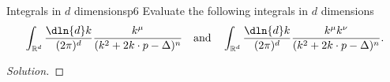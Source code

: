 \begin{problem}{Integrals in \(d\) dimensions}{p6}
   Evaluate the following integrals in \(d\) dimensions
   \begin{equation*}
      \int_{\mathbb{R}^d} \frac{\dln{d}k}{(2\pi)^d} \frac{k^\mu}{(k^2 + 2k \cdot p - \Delta)^n}
      \quad\text{and}\quad
      \int_{\mathbb{R}^d} \frac{\dln{d}k}{(2\pi)^d} \frac{k^\mu k^\nu}{(k^2 + 2k \cdot p - \Delta)^n}.
   \end{equation*}
\end{problem}
\begin{proof}[Solution]
    
\end{proof}
